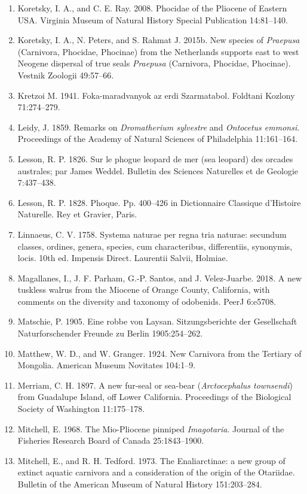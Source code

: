 \documentclass[a4paper, 12pt]{article}
\begin{document}
\begin{enumerate}
\item Koretsky, I. A., and C. E. Ray. 2008. Phocidae of the Pliocene of Eastern USA. Virginia Museum of Natural History Special Publication 14:81–140.
\item Koretsky, I. A., N. Peters, and S. Rahmat J. 2015b. New species of \textit{Praepusa} (Carnivora, Phocidae, Phocinae) from the Netherlands supports east to west Neogene dispersal of true seals \textit{Praepusa} (Carnivora, Phocidae, Phocinae). Vestnik Zoologii 49:57–66.
\item Kretzoi M. 1941. Foka-maradvanyok az erdi Szarmatabol. Foldtani Kozlony 71:274–279.
\item Leidy, J. 1859. Remarks on \textit{Dromatherium sylvestre} and \textit{Ontocetus emmonsi}. Proceedings of the Academy of Natural Sciences of Philadelphia 11:161–164.
\item Lesson, R. P. 1826. Sur le phogue leopard de mer (sea leopard) des orcades australes; par James Weddel. Bulletin des Sciences Naturelles et de Geologie 7:437–438.
\item Lesson, R. P. 1828. Phoque. Pp. 400–426 in Dictionnaire Classique d'Histoire Naturelle. Rey et Gravier, Paris.
\item Linnaeus, C. V. 1758. Systema naturae per regna tria naturae: secundum classes, ordines, genera, species, cum characteribus, differentiis, synonymis, locis. 10th ed. Impensis Direct. Laurentii Salvii, Holmiae.
\item Magallanes, I., J. F. Parham, G.-P. Santos, and J. Velez-Juarbe. 2018. A new tuskless walrus from the Miocene of Orange County, California, with comments on the diversity and taxonomy of odobenids. PeerJ 6:e5708.
\item Matschie, P. 1905. Eine robbe von Laysan. Sitzungsberichte der Gesellschaft Naturforschender Freunde zu Berlin 1905:254–262.
\item Matthew, W. D., and W. Granger. 1924. New Carnivora from the Tertiary of Mongolia. American Museum Novitates 104:1–9.
\item Merriam, C. H. 1897. A new fur-seal or sea-bear (\textit{Arctocephalus townsendi}) from Guadalupe Island, off Lower California. Proceedings of the Biological Society of Washington 11:175–178.
\item Mitchell, E. 1968. The Mio-Pliocene pinniped \textit{Imagotaria}. Journal of the Fisheries Research Board of Canada 25:1843–1900.
\item Mitchell, E., and R. H. Tedford. 1973. The Enaliarctinae: a new group of extinct aquatic carnivora and a consideration of the origin of the Otariidae. Bulletin of the American Museum of Natural History 151:203–284.

\end{enumerate}
\end{document}
